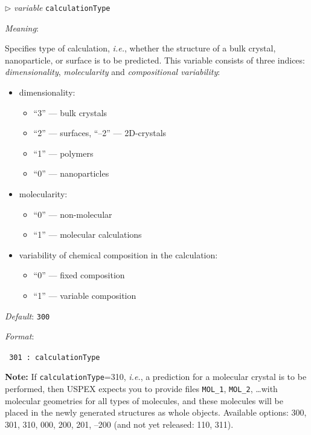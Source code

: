 \documentclass[12pt]{article}
\newcommand{\keyword}[1]{\texttt{#1}}
\newcommand{\file}[1]{\texttt{#1}}
\newcommand{\paramacro}[6]{
\vspace{0.5cm}
$\triangleright$ \emph{variable} {\color{blue} \texttt{#1}}

\emph{Meaning}: {#2}

{#3}

\emph{Default}: \texttt{#4}

\emph{Format}:

{\addtolength{\leftskip}{10mm} 
\texttt{#5}
\par}


{\small #6}

}
\begin{document}
\paramacro{calculationType}{Specifies type of calculation, \emph{i.e.}, whether
the structure of a bulk crystal, nanoparticle, or surface is to be predicted.
This variable consists of three indices: \emph{dimensionality},
\emph{molecularity} and \emph{compositional variability}:
\begin{itemize}
	\item dimensionality:
	\begin{itemize}
	  \item[] ``3'' --- bulk crystals
	  \item[] ``2'' --- surfaces, ``--2'' --- 2D-crystals
	  \item[] ``1'' --- polymers
	  \item[] ``0'' --- nanoparticles
	\end{itemize}
	\item molecularity:
	\begin{itemize}
	  \item[] ``0'' --- non-molecular
	  \item[] ``1'' --- molecular calculations
	\end{itemize}
	\item variability of chemical composition in the calculation:
	\begin{itemize}
	  \item[] ``0'' --- fixed composition
	  \item[] ``1'' --- variable composition
	\end{itemize}
\end{itemize}
}{}{300}{
301     : calculationType
}{\textbf{Note:} If \keyword{calculationType}=310, \emph{i.e.}, a prediction for
a molecular crystal is to be performed, then USPEX expects you to provide files
\file{MOL\_1}, \file{MOL\_2}, \ldots with molecular geometries for all types of
molecules, and these molecules will be placed in the newly generated structures
as whole objects. Available options: 300, 301, 310, 000, 200, 201, --200 (and
not yet released: 110, 311).}
\end{document}
